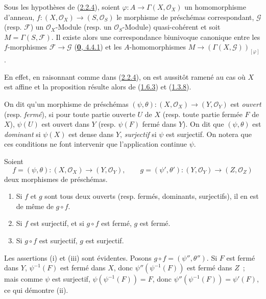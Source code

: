 \begin{proposition}[2.2.5]
\label{I.2.2.5-fr}
Sous les hypothèses de \textup{(\hyperref[I.2.2.4-fr]{2.2.4})}, soient
$\varphi:A\to\Gamma(X,\mathscr{O}_X)$ un homomorphisme d'anneau,
$f:(X,\mathscr{O}_X)\to(S,\mathscr{O}_S)$ le morphisme de préschémas
correspondant, $\mathscr{G}$ \textup{(resp. $\mathscr{F}$)} un
$\mathscr{O}_X$-Module \textup{(resp.} un $\mathscr{O}_S$-Module) quasi-cohérent et
soit $M=\Gamma(S,\mathscr{F})$. Il existe alors une
correspondance biunivoque canonique entre les $f$-morphismes
$\mathscr{F}\to\mathscr{G}$ \textup{(\hyperref[0.4.4.1-fr]{\textbf{0}, 4.4.1})} et les
$A$-homomorphismes
$M\to(\Gamma(X,\mathscr{G}))_{[\varphi]}$.
\end{proposition}

En effet, en raisonnant comme dans (\hyperref[I.2.2.4-fr]{2.2.4}), on est
aussitôt ramené au cas où $X$ est affine et la proposition résulte alors de
(\hyperref[I.1.6.3-fr]{1.6.3}) et (\hyperref[I.1.3.8-fr]{1.3.8}).

\begin{env}[2.2.6]
\label{I.2.2.6-fr}
On dit qu'un morphisme de préschémas
$(\psi,\theta):(X,\mathscr{O}_X)\to(Y,\mathscr{O}_Y)$ est \emph{ouvert}
(resp. \emph{fermé}), si pour toute partie ouverte $U$ de $X$ (resp. toute
partie fermée $F$ de $X$), $\psi(U)$ est ouvert dans $Y$ (resp. $\psi(F)$
fermé dans $Y$). On dit que $(\psi,\theta)$ est \emph{dominant} si $\psi(X)$
est dense dans $Y$, \emph{surjectif} si $\psi$ est surjectif. On notera que
ces conditions ne font intervenir que l'application continue $\psi$.
\end{env}

\begin{proposition}[2.2.7]
\label{I.2.2.7-fr}
Soient
\[
  f=(\psi,\theta):(X,\mathscr{O}_X)\to(Y,\mathscr{O}_Y),
  \qquad
  g=(\psi',\theta'):(Y,\mathscr{O}_Y)\to(Z,\mathscr{O}_Z)
\]
deux morphismes de préschémas.
\begin{enumerate}
  \item[\rm(i)] Si $f$ et $g$ sont tous deux ouverts \textup{(resp.} fermés, dominants,
    surjectifs), il en est de même de $g\circ f$.
  \item[\rm(ii)] Si $f$ est surjectif, et si $g\circ f$ est fermé, $g$ est
    fermé.
  \item[\rm(iii)] Si $g\circ f$ est surjectif, $g$ est surjectif.
\end{enumerate}
\end{proposition}

Les assertions (i) et (iii) sont évidentes. Posons
$g\circ f=(\psi'',\theta'')$. Si $F$ est fermé dans $Y$,
$\psi^{-1}(F)$ est fermé dans $X$, donc
$\psi''(\psi^{-1}(F))$ est fermé dans $Z$~; mais comme $\psi$ est surjectif,
$\psi(\psi^{-1}(F))=F$, donc
$\psi''(\psi^{-1}(F))=\psi'(F)$, ce qui démontre (ii).

